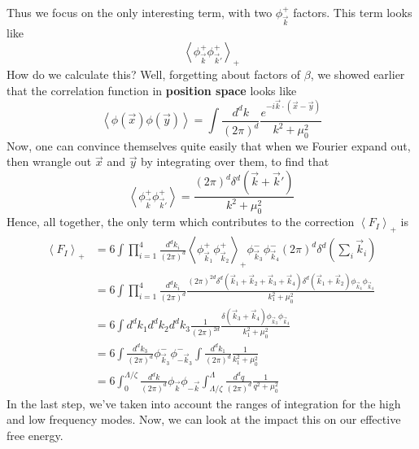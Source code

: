 Thus we focus on the only interesting term, with two 
$ \phi _ \vec{k} ^ + $  factors. This term looks like 
\[
 \left< \phi_{ \vec{k} } ^ + \phi_{ \vec{k} ' } ^ +  \right> _ + 
\] How do we calculate this? Well, forgetting about 
factors of $ \beta $, we showed earlier that the 
correlation function in \textbf{position space} looks 
like
\[
	\left< \phi ( \vec{x} ) \phi (  \vec{y} )   \right> = 
	\int \frac{ d ^ d k }{ ( 2 \pi ) ^ d } 
	\frac{ e ^{  - i \vec{k} \cdot  ( \vec{x} - \vec{y} ) }}{k ^ 2 + \mu _ 0 ^ 2 }
\] Now, one can convince themselves quite easily 
that when we Fourier expand out, then wrangle out $ \vec{x} $ and $ \vec{y}$
by integrating over them, to find that 
\[
 \left< \phi_{ \vec{k} } ^ + \phi_{ \vec{k} ' } ^ +  \right> 
 = \frac{ ( 2 \pi ) ^ d  \delta ^ d ( \vec{k} + \vec{k} ' ) }{
 k ^ 2 + \mu _ 0 ^ 2 }
\] 
Hence, all together, the only term which contributes 
to the correction $ \left< F_I  \right> _ + $ is 
\begin{align*}
	\left< F _ I  \right> _ + &= 6  
	\int \prod_{ i = 1 } ^ 4 \frac{ d ^ d k_ i }{ ( 2 \pi ) ^ d } 
	\left< \phi _{ \vec{k} _ 1 } ^ + \phi _{ \vec{k} _ 2 } ^ +  \right> _ + 
	\phi _{ \vec{k} _ 3 } ^ - \phi _{ \vec{k} _ 4 } ^ - 
	( 2 \pi ) ^ d \delta ^ d ( \sum _ i \vec{k} _ i  ) \\
				  &= 6 \int \prod_{ i = 1 } ^ 4 \frac{ d ^ d k _ i }{ ( 2 \pi ) ^ d } \frac{ ( 2 \pi ) ^{ 2d } \delta ^ d ( 
				  \vec{k} _ 1 + \vec{k} _ 2 + \vec{k} _ 3 + \vec{k} _ 4 ) \delta ^ d ( \vec{k} _ 1 + \vec{k} _ 2 ) \phi _{ \vec{k} _4 } \phi _{\vec{k} _ 4 } }{ k_  1 ^ 2 + \mu _ 0 ^ 2 } \\
	 &=  6\int d ^ d k_ 1 d ^ d k_ 2 d ^ d k _ 3 
	 \frac{1}{( 2 \pi ) ^ {2d} } \frac{ \delta ( \vec{k} _ 3 + \vec{k} _ 4 ) 
	\phi _{ \vec{k} _ 3 } \phi _{ \vec{k} _ 4 } }{k_ 1 ^ 2 + \mu _ 0 ^ 2}\\
				  &= 6 \int \frac{d ^ d k _3 }{ ( 2 \pi ) ^ d }
				  \phi _{ \vec{k} _ 3 }^ -  \phi _{  - \vec{k} _ 3 } ^ - \int \frac{ d ^ d k _ 1 }{ ( 2 \pi ) ^ d } \frac{1}{k _ 1 ^ 2 + 
				  \mu _ 0 ^ 2 } \\
				  &= 6 \int_ 0 ^{ \Lambda / \zeta } \frac{d ^ d k }{ ( 2 \pi ) ^ d } \phi_{ \vec{k} } \phi _{  - \vec{k} } \int_{ \Lambda / \zeta } ^ \Lambda   \frac{d ^ d q }{ ( 
				  2 \pi ) ^ d } \frac{ 1 }{ q ^ 2 + \mu _ 0 ^ 2 }
\end{align*}
In the last step, we've taken into account the 
ranges of integration for the high and low frequency modes.
Now, we can look at the impact this on our 
effective free energy. 

